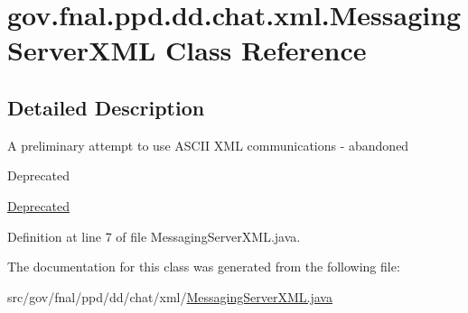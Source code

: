 \hypertarget{classgov_1_1fnal_1_1ppd_1_1dd_1_1chat_1_1xml_1_1MessagingServerXML}{\section{gov.\-fnal.\-ppd.\-dd.\-chat.\-xml.\-Messaging\-Server\-X\-M\-L Class Reference}
\label{classgov_1_1fnal_1_1ppd_1_1dd_1_1chat_1_1xml_1_1MessagingServerXML}
}


\subsection{Detailed Description}
A preliminary attempt to use A\-S\-C\-I\-I X\-M\-L communications -\/ abandoned \begin{DoxyRefDesc}{Deprecated}
\item[\hyperlink{deprecated__deprecated000006}{Deprecated}]\end{DoxyRefDesc}


Definition at line 7 of file Messaging\-Server\-X\-M\-L.\-java.



The documentation for this class was generated from the following file\-:\begin{DoxyCompactItemize}
\item 
src/gov/fnal/ppd/dd/chat/xml/\hyperlink{MessagingServerXML_8java}{Messaging\-Server\-X\-M\-L.\-java}\end{DoxyCompactItemize}
